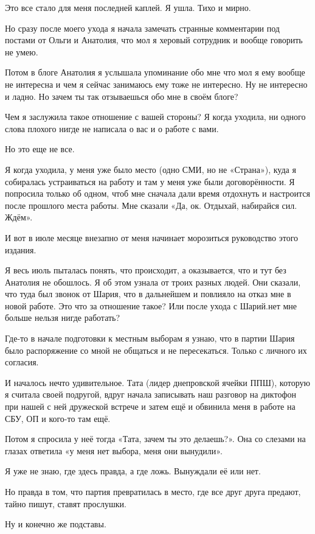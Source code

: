 Это все стало для меня последней каплей. Я ушла. Тихо и мирно. 

Но сразу после моего ухода я начала замечать странные комментарии под постами
от Ольги и Анатолия, что мол я херовый сотрудник и вообще говорить не умею. 

Потом в блоге Анатолия я услышала упоминание обо мне что мол я ему вообще не
интересна и чем я сейчас занимаюсь ему тоже не интересно. Ну не интересно и
ладно. Но зачем ты так отзываешься обо мне в своём блоге? 

Чем я заслужила такое отношение с вашей стороны? Я когда уходила, ни одного
слова плохого нигде не написала о вас и о работе с вами. 

Но это еще не все.

Я когда уходила, у меня уже было место (одно СМИ, но не «Страна»), куда я
собиралась устраиваться на работу и там у меня уже были договорённости. Я
попросила только об одном, чтоб мне сначала дали время отдохнуть и настроится
после прошлого места работы. Мне сказали «Да, ок. Отдыхай, набирайся сил.
Ждём». 

И вот в июле месяце внезапно от меня начинает морозиться руководство этого издания. 

Я весь июль пыталась понять, что происходит, а оказывается, что и тут без
Анатолия не обошлось. Я об этом узнала от троих разных людей. Они сказали, что
туда был звонок от Шария, что в дальнейшем и повлияло на отказ мне в новой
работе. Это что за отношение такое? Или после ухода с Шарий.нет мне больше
нельзя нигде работать? 

Где-то в начале подготовки к местным выборам я узнаю, что в партии Шария было
распоряжение со мной не общаться и не пересекаться. Только с личного их
согласия. 

И началось нечто удивительное. Тата (лидер днепровской ячейки ППШ), которую я
считала своей подругой, вдруг начала записывать наш разговор на диктофон при
нашей с ней дружеской встрече и затем ещё и обвинила меня в работе на СБУ, ОП и
кого-то там ещё. 

Потом я спросила у неё тогда «Тата, зачем ты это делаешь?». Она со слезами на
глазах ответила «у меня нет выбора, меня они вынудили». 

Я уже не знаю, где здесь правда, а где ложь. Вынуждали её или нет. 

Но правда в том, что партия превратилась в место, где все друг друга предают,
тайно пишут, ставят прослушки. 

Ну и конечно же подставы. 

